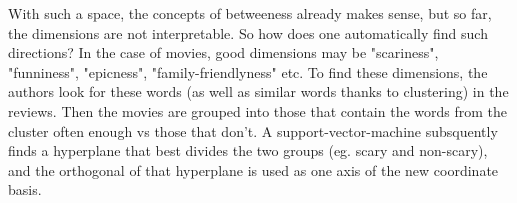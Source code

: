 \documentclass[11pt,
  paper=a4, 
  hidelinks,
  bibliography=totocnumbered,
	captions=tableheading,
	BCOR=10mm
]{scrreprt}
\theoremstyle{definition}
\newcommand{\figref}[1]{(Figure \ref{#1})}
\newcommand{\tabref}[1]{(Table \ref{#1})}
\newcommand\slcaption[1]{\setsepchar{.}\readlist*\pdots{#1}\caption[{\pdots[1].}]{#1}}
\begin{document}
With such a space, the concepts of betweeness already makes sense, but so far, the dimensions are not interpretable. So how does one automatically find such directions? In the case of movies, good dimensions may be "scariness", "funniness", "epicness", "family-friendlyness" etc. 
To find these dimensions, the authors look for these words (as well as similar words thanks to clustering) in the reviews. Then the movies are grouped into those that contain the words from the cluster often enough vs those that don't. A support-vector-machine subsquently finds a hyperplane that best divides the two groups (eg. scary and non-scary), and the orthogonal of that hyperplane is used as one axis of the new coordinate basis. 





\end{document}

